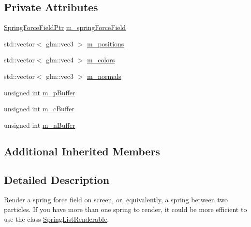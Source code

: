 \subsection*{Private Attributes}
\begin{DoxyCompactItemize}
\item 
\hyperlink{SpringForceField_8hpp_a3f4fbe1af2c46f8804b45f804dacc708}{Spring\+Force\+Field\+Ptr} \hyperlink{classSpringForceFieldRenderable_aa19b3084a552a59ceebf51ed5be92ea6}{m\+\_\+spring\+Force\+Field}
\item 
std\+::vector$<$ glm\+::vec3 $>$ \hyperlink{classSpringForceFieldRenderable_a09d7a928050183560e66aec4cad6c616}{m\+\_\+positions}
\item 
std\+::vector$<$ glm\+::vec4 $>$ \hyperlink{classSpringForceFieldRenderable_aabc44da4bf82b70a101dfffdd1ee2713}{m\+\_\+colors}
\item 
std\+::vector$<$ glm\+::vec3 $>$ \hyperlink{classSpringForceFieldRenderable_a82d45ea9543e4308a909b2890ae7d9b0}{m\+\_\+normals}
\item 
unsigned int \hyperlink{classSpringForceFieldRenderable_aff6f71fa77becfdbc5a14b6ff2701e8c}{m\+\_\+p\+Buffer}
\item 
unsigned int \hyperlink{classSpringForceFieldRenderable_ac970d8fbdb56983f09680e3c505999f6}{m\+\_\+c\+Buffer}
\item 
unsigned int \hyperlink{classSpringForceFieldRenderable_ab52ba645d894920eba38ed71799d52e3}{m\+\_\+n\+Buffer}
\end{DoxyCompactItemize}
\subsection*{Additional Inherited Members}


\subsection{Detailed Description}
Render a spring force field on screen, or, equivalently, a spring between two particles. If you have more than one spring to render, it could be more efficient to use the class \hyperlink{classSpringListRenderable}{Spring\+List\+Renderable}. 

